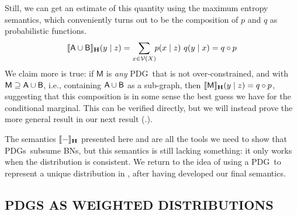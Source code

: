 \documentclass{article}
\newcommand\MaxEnt{_{\mathbf H}}
\newcommand{\V}{\mathcal V}
\newcommand{\sfM}{\mathsf M}
\newcommand{\MN}{PDG}
\newcommand{\MNs}{\MN s}
\numberwithin{equation}{section}
\begin{document}
\begin{notfocus}
\begin{example}[composition]
		Still, we can get an estimate of this quantity using the maximum entropy semantics, which conveniently turns out to be the composition of $p$ and $q$ as probabilistic functions.
		$$ \bbr{{\sf A \cup B}}\MaxEnt(y \mid z) = \sum_{x \in \V(X)}\!\! p (x \mid z)\ q(y \mid x) = q \circ p $$
		We claim more is true: if $\sfM$ is \emph{any} \MN\ that is not over-constrained, and with $\sfM \supseteq \sf A \cup B$, i.e., containing $\sf A \cup B$ as a sub-graph, then
		$ \bbr{\sfM}\MaxEnt(y \mid z) = q \circ p$,
		suggesting that this composition is in some sense the best guess we have for the conditional marginal. 
		This can be verified directly, but we will instead prove the more general result in our next result (.).
	\end{example}

	The semantics $\bbr{-}\MaxEnt$ presented here and  are all the tools we need to show that \MNs\ subsume BNs, but this semantics is still lacking something: it only works when the distribution is consistent.
	We return to the idea of using a \MN\ to represent a unique distribution in , after having developed our final semantics. 

	\subsection{\MN S AS WEIGHTED DISTRIBUTIONS} \label{sec:weighted-semantics}
	

\end{notfocus}
\end{document}
